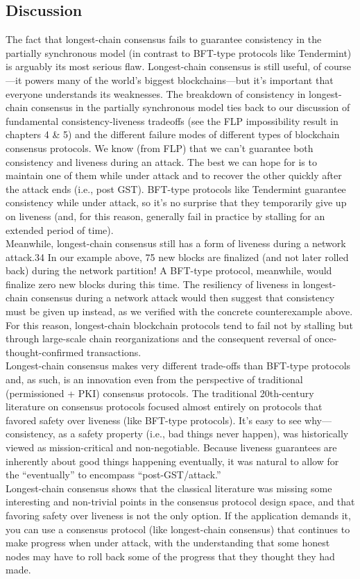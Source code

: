\subsection{Discussion}
The fact that longest-chain consensus fails to guarantee consistency in the partially synchronous model (in contrast to BFT-type protocols like Tendermint) is arguably its most
serious flaw. Longest-chain consensus is still useful, of course—it powers many of the
world’s biggest blockchains—but it’s important that everyone understands its weaknesses.
The breakdown of consistency in longest-chain consensus in the partially synchronous
model ties back to our discussion of fundamental consistency-liveness tradeoffs (see the FLP
impossibility result in chapters 4 & 5) and the different failure modes of different types
of blockchain consensus protocols. We know (from FLP) that we can’t guarantee both
consistency and liveness during an attack. The best we can hope for is to maintain one of
them while under attack and to recover the other quickly after the attack ends (i.e., post GST). BFT-type protocols like Tendermint guarantee consistency while under attack, so it’s
no surprise that they temporarily give up on liveness (and, for this reason, generally fail in
practice by stalling for an extended period of time).\\
Meanwhile, longest-chain consensus still has a form of liveness during a network attack.34
In our example above, 75 new blocks are finalized (and not later rolled back) during the
network partition! A BFT-type protocol, meanwhile, would finalize zero new blocks during
this time. The resiliency of liveness in longest-chain consensus during a network attack
would then suggest that consistency must be given up instead, as we verified with the
concrete counterexample above. For this reason, longest-chain blockchain protocols tend to
fail not by stalling but through large-scale chain reorganizations and the consequent reversal
of once-thought-confirmed transactions.\\
Longest-chain consensus makes very different trade-offs than BFT-type protocols and, as
such, is an innovation even from the perspective of traditional (permissioned + PKI) consensus protocols. The traditional 20th-century literature on consensus protocols focused almost
entirely on protocols that favored safety over liveness (like BFT-type protocols). It’s easy to
see why—consistency, as a safety property (i.e., bad things never happen), was historically
viewed as mission-critical and non-negotiable. Because liveness guarantees are inherently
about good things happening eventually, it was natural to allow for the “eventually” to
encompass “post-GST/attack.”\\
Longest-chain consensus shows that the classical literature was missing some interesting
and non-trivial points in the consensus protocol design space, and that favoring safety over
liveness is not the only option. If the application demands it, you can use a consensus
protocol (like longest-chain consensus) that continues to make progress when under attack,
with the understanding that some honest nodes may have to roll back some of the progress
that they thought they had made.

